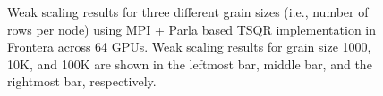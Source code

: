 \documentclass{article}
\makeatletter
\newcommand\resetstackedplotsOne{
\makeatletter
\pgfplots@stacked@isfirstplottrue
\makeatother
\addplot [forget plot,draw=none] coordinates{(1,0) (2,0) (4,0) (8,0) (16,0)};
}
\makeatother
\begin{document}
\begin{figure}[!tbhp]
    \caption{ Weak scaling results for three different grain sizes (i.e., number of rows per node) using MPI + Parla based TSQR implementation in Frontera across 64 GPUs. Weak scaling results for grain size 1000, 10K, and 100K are shown in the leftmost bar, middle bar, and the rightmost bar, respectively. \label{fig:parla_ws}
    }
\end{figure}
\end{document}
